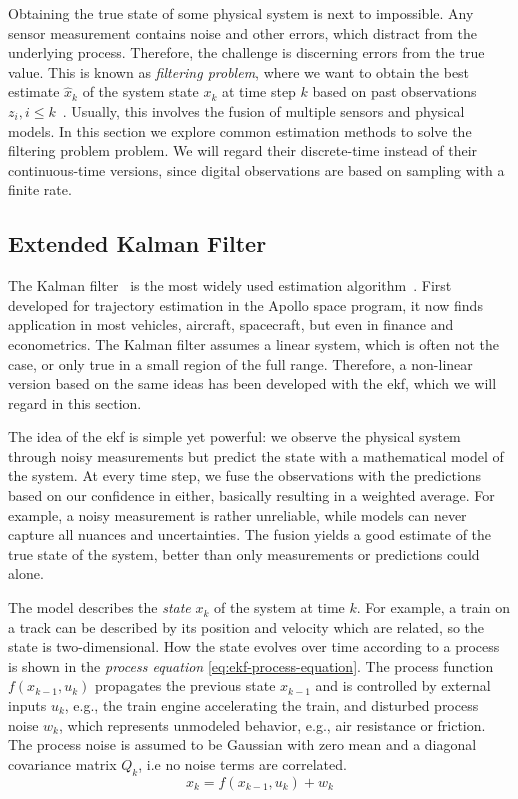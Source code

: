 Obtaining the true state of some physical system is next to impossible. Any sensor measurement contains noise and other errors, which distract from the underlying process. Therefore, the challenge is discerning errors from the true value. This is known as \textit{filtering problem}, where we want to obtain the best estimate $\hat{x}_k$ of the system state $x_k$ at time step $k$ based on past observations $z_i, i \leq k$~\cite[p.~67]{Mitter.1996}. Usually, this involves the fusion of multiple sensors and physical models. In this section we explore common estimation methods to solve the filtering problem problem. We will regard their discrete-time instead of their continuous-time versions, since digital observations are based on sampling with a finite rate.

\subsection{Extended Kalman Filter}\label{sec:background-ekf}
The Kalman filter~\cite{Kalman.1960} is the most widely used estimation algorithm~\cite[p.~401]{Julier.2004}. First developed for trajectory estimation in the Apollo space program, it now finds application in most vehicles, aircraft, spacecraft, but even in finance and econometrics. The Kalman filter assumes a linear system, which is often not the case, or only true in a small region of the full range. Therefore, a non-linear version based on the same ideas has been developed with the \gls{ekf}, which we will regard in this section.

The idea of the \gls{ekf} is simple yet powerful: we observe the physical system through noisy measurements but predict the state with a mathematical model of the system. At every time step, we fuse the observations with the predictions based on our confidence in either, basically resulting in a weighted average. For example, a noisy measurement is rather unreliable, while models can never capture all nuances and uncertainties. The fusion yields a good estimate of the true state of the system, better than only measurements or predictions could alone.

The model describes the \textit{state} $x_k$ of the system at time $k$. For example, a train on a track can be described by its position and velocity which are related, so the state is two-dimensional. How the state evolves over time according to a process is shown in the \textit{process equation} \ref{eq:ekf-process-equation}. The process function $f(x_{k-1}, u_k)$ propagates the previous state $x_{k-1}$ and is controlled by external inputs $u_k$, e.g., the train engine accelerating the train, and disturbed process noise $w_k$, which represents unmodeled behavior, e.g., air resistance or friction. The process noise is assumed to be Gaussian with zero mean and a diagonal covariance matrix $Q_k$, i.e no noise terms are correlated.
\begin{equation}\label{eq:ekf-process-equation}%
x_k = f(x_{k-1}, u_k) + w_k%
\end{equation}


